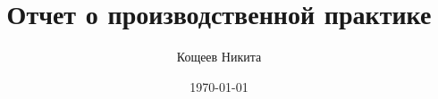 \sloppy

\EqInChapter %
\TableInChapter %
\PicInChapter %

\author{Кощеев Никита}
\title{Отчет о производственной практике}
\date{\today}

\usepackage{pscyr}
\renewcommand{\rmdefault}{ftm}

\usepackage[
bookmarks=true, colorlinks=true, unicode=true,
urlcolor=black,linkcolor=black, anchorcolor=black,
citecolor=black, menucolor=black, filecolor=black,
]{hyperref}

\usepackage{graphicx}
\graphicspath{ {images/} }

\geometry{right=20mm}
\geometry{left=30mm}

\usepackage{enumerate}

\usepackage{multirow}

\usepackage{paralist,array}


\newcommand{\dimension}{\mathbb{R}^n}